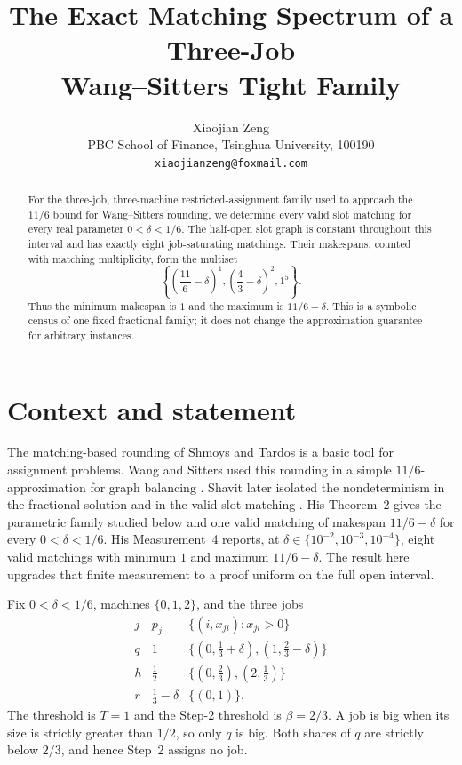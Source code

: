 \documentclass[11pt]{article}
\title{The Exact Matching Spectrum of a Three-Job\\Wang--Sitters Tight Family}
\author{Xiaojian Zeng\\
\small PBC School of Finance, Tsinghua University, 100190\\
\small \texttt{xiaojianzeng@foxmail.com}}
\date{}
\begin{document}
\maketitle

\begin{abstract}
For the three-job, three-machine restricted-assignment family used to approach
the $11/6$ bound for Wang--Sitters rounding, we determine every valid slot
matching for every real parameter $0<\delta<1/6$.  The half-open slot graph is
constant throughout this interval and has exactly eight job-saturating
matchings.  Their makespans, counted with matching multiplicity, form the
multiset
\[
 \left\{\left(\frac{11}{6}-\delta\right)^1,
 \left(\frac43-\delta\right)^2,1^5\right\}.
\]
Thus the minimum makespan is $1$ and the maximum is
$11/6-\delta$.  This is a symbolic census of one fixed fractional family; it
does not change the approximation guarantee for arbitrary instances.
\end{abstract}

\section{Context and statement}

The matching-based rounding of Shmoys and Tardos
\cite{ShmoysTardos1993} is a basic tool for assignment problems.  Wang and
Sitters used this rounding in a simple $11/6$-approximation for graph balancing
\cite{WangSitters2016}.  Shavit later isolated the nondeterminism in the
fractional solution and in the valid slot matching \cite{Shavit2026}.  His
Theorem~2 gives the parametric family studied below and one valid matching of
makespan $11/6-\delta$ for every $0<\delta<1/6$.  His Measurement~4 reports,
at $\delta\in\{10^{-2},10^{-3},10^{-4}\}$, eight valid matchings with minimum
$1$ and maximum $11/6-\delta$.  The result here upgrades that finite
measurement to a proof uniform on the full open interval.

Fix $0<\delta<1/6$, machines $\{0,1,2\}$, and the three jobs
\[
\begin{array}{c|c|c}
 j & p_j & \{(i,x_{ji}):x_{ji}>0\}\\ \hline
 q&1&\{(0,\frac13+\delta),(1,\frac23-\delta)\}\\
 h&\frac12&\{(0,\frac23),(2,\frac13)\}\\
 r&\frac13-\delta&\{(0,1)\}.
\end{array}
\]
The threshold is $T=1$ and the Step-2 threshold is $\beta=2/3$.
A job is big when its size is strictly greater than $1/2$, so only $q$ is
big.  Both shares of $q$ are strictly below $2/3$, and hence Step~2 assigns no
job.
\end{document}
